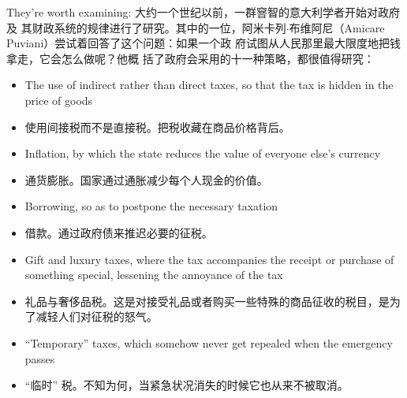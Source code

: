 \begin{paracol}{2}
They're worth examining:
\switchcolumn
大约一个世纪以前，一群窨智的意大利学者开始对政府及
其财政系统的规律进行了研究。其中的一位，阿米卡列$\cdot$布维阿尼（Amicare Puviani）尝试着回答了这个问题：如果一个政
府试图从人民那里最大限度地把钱拿走，它会怎么做呢？他概
括了政府会采用的十一种策略，都很值得研究：
\switchcolumn*
\begin{itemize}
	\item The use of indirect rather than direct taxes, so that the tax
	is hidden in the price of goods
\end{itemize}
\switchcolumn
\begin{itemize}
	\item 使用间接税而不是直接税。把税收藏在商品价格背后。
\end{itemize}
\switchcolumn*
\begin{itemize}
	\item Inflation, by which the state reduces the value of everyone
	else's currency
\end{itemize}
\switchcolumn
\begin{itemize}
	\item 通货膨胀。国家通过通胀减少每个人现金的价值。
\end{itemize}
\switchcolumn*
\begin{itemize}
	\item Borrowing, so as to postpone the necessary taxation
\end{itemize}
\switchcolumn
\begin{itemize}
	\item 借款。通过政府债来推迟必要的征税。
\end{itemize}
\switchcolumn*
\begin{itemize}
	\item Gift and luxury taxes, where the tax accompanies the receipt or purchase of something special, lessening the annoyance of the tax
\end{itemize}
\switchcolumn
\begin{itemize}
	\item 礼品与奢侈品税。这是对接受礼品或者购买一些特殊的商品征收的税目，是为了减轻人们对征税的怒气。
\end{itemize}
\switchcolumn*
\begin{itemize}
	\item ``Temporary'' taxes, which somehow never get repealed when the emergency passes
\end{itemize}
\switchcolumn
\begin{itemize}
	\item “临时” 税。不知为何，当紧急状况消失的时候它也从来不被取消。

\end{itemize}
\end{paracol}

